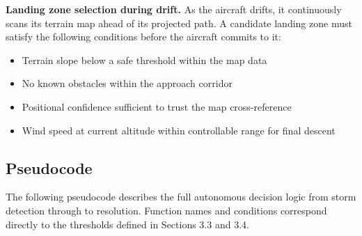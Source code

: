 \documentclass[a4paper,12pt]{article}
\begin{document}
\textbf{Landing zone selection during drift.} As the aircraft drifts, it continuously scans
its terrain map ahead of its projected path. A candidate landing zone must satisfy the following
conditions before the aircraft commits to it:

\begin{itemize}[itemsep=0.3em]
    \item Terrain slope below a safe threshold within the map data
    \item No known obstacles within the approach corridor
    \item Positional confidence sufficient to trust the map cross-reference
    \item Wind speed at current altitude within controllable range for final descent
\end{itemize}

\subsection{Pseudocode}
The following pseudocode describes the full autonomous decision logic from storm detection
through to resolution. Function names and conditions correspond directly to the thresholds
defined in Sections 3.3 and 3.4.
\end{document}
